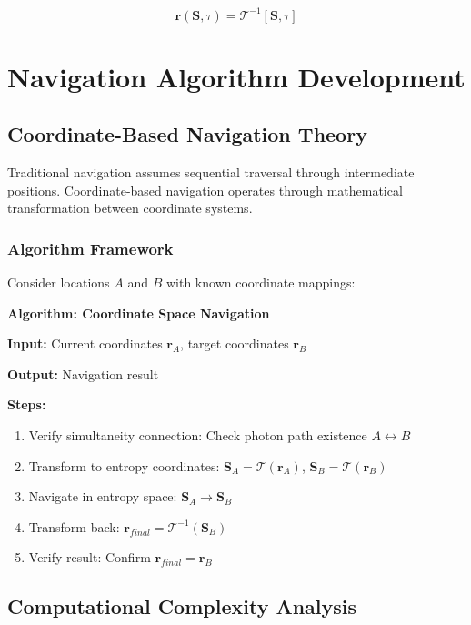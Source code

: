 \documentclass[12pt,a4paper]{article}
\begin{document}
\begin{equation}
\mathbf{r}(\mathbf{S}, \tau) = \mathcal{T}^{-1}[\mathbf{S}, \tau]
\label{eq:inverse_transform}
\end{equation}

\section{Navigation Algorithm Development}

\subsection{Coordinate-Based Navigation Theory}

Traditional navigation assumes sequential traversal through intermediate positions. Coordinate-based navigation operates through mathematical transformation between coordinate systems.

\subsubsection{Algorithm Framework}

Consider locations $A$ and $B$ with known coordinate mappings:

\textbf{Algorithm: Coordinate Space Navigation}

\textbf{Input:} Current coordinates $\mathbf{r}_A$, target coordinates $\mathbf{r}_B$

\textbf{Output:} Navigation result

\textbf{Steps:}
\begin{enumerate}
\item Verify simultaneity connection: Check photon path existence $A \leftrightarrow B$
\item Transform to entropy coordinates: $\mathbf{S}_A = \mathcal{T}(\mathbf{r}_A)$, $\mathbf{S}_B = \mathcal{T}(\mathbf{r}_B)$
\item Navigate in entropy space: $\mathbf{S}_A \rightarrow \mathbf{S}_B$
\item Transform back: $\mathbf{r}_{final} = \mathcal{T}^{-1}(\mathbf{S}_B)$
\item Verify result: Confirm $\mathbf{r}_{final} = \mathbf{r}_B$
\end{enumerate}

\subsection{Computational Complexity Analysis}
\end{document}
